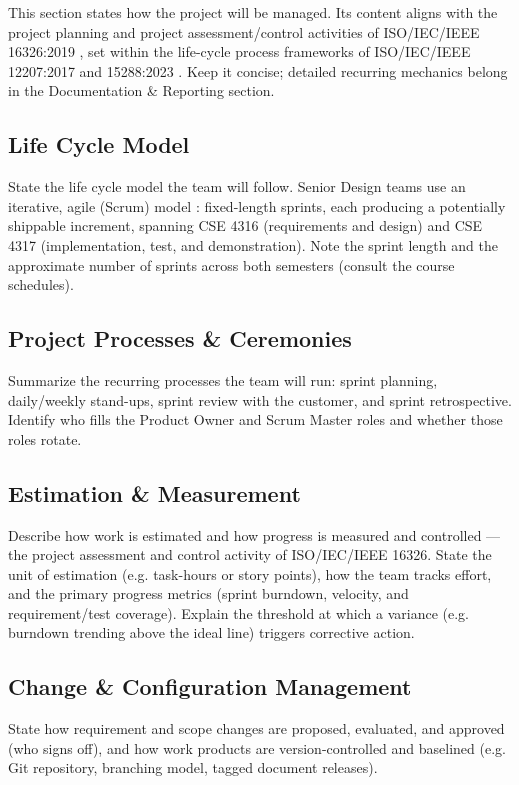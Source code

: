 This section states how the project will be managed. Its content aligns with the project planning and project assessment/control activities of ISO/IEC/IEEE 16326:2019 \cite{ISO16326}, set within the life-cycle process frameworks of ISO/IEC/IEEE 12207:2017 \cite{ISO12207} and 15288:2023 \cite{ISO15288}. Keep it concise; detailed recurring mechanics belong in the Documentation \& Reporting section.

\subsection{Life Cycle Model}
State the life cycle model the team will follow. Senior Design teams use an iterative, agile (Scrum) model \cite{Rubin2012, SchwaberSutherland2020}: fixed-length sprints, each producing a potentially shippable increment, spanning CSE 4316 (requirements and design) and CSE 4317 (implementation, test, and demonstration). Note the sprint length and the approximate number of sprints across both semesters (consult the course schedules).

\subsection{Project Processes \& Ceremonies}
Summarize the recurring processes the team will run: sprint planning, daily/weekly stand-ups, sprint review with the customer, and sprint retrospective. Identify who fills the Product Owner and Scrum Master roles and whether those roles rotate.

\subsection{Estimation \& Measurement}
Describe how work is estimated and how progress is measured and controlled --- the project assessment and control activity of ISO/IEC/IEEE 16326. State the unit of estimation (e.g. task-hours or story points), how the team tracks effort, and the primary progress metrics (sprint burndown, velocity, and requirement/test coverage). Explain the threshold at which a variance (e.g. burndown trending above the ideal line) triggers corrective action.

\subsection{Change \& Configuration Management}
State how requirement and scope changes are proposed, evaluated, and approved (who signs off), and how work products are version-controlled and baselined (e.g. Git repository, branching model, tagged document releases).
